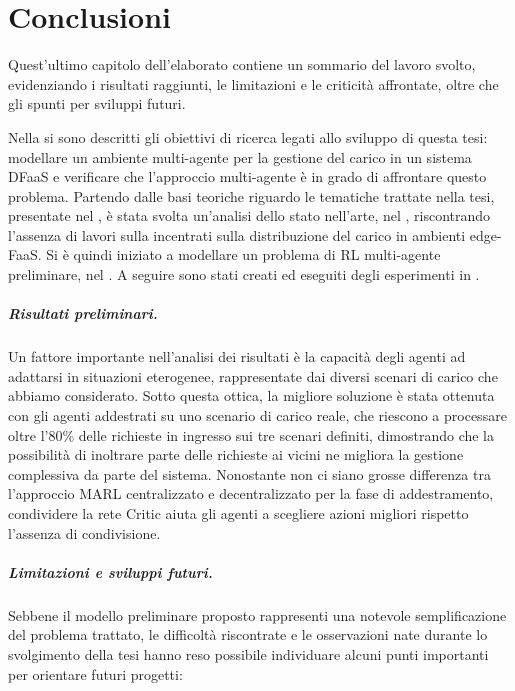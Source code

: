 \chapter{Conclusioni}
\label{sec:6_conclusioni}

Quest'ultimo capitolo dell'elaborato contiene un sommario del lavoro svolto, evidenziando i risultati raggiunti, le limitazioni e le criticità affrontate, oltre che gli spunti per sviluppi futuri.

Nella  si sono descritti gli obiettivi di ricerca legati allo sviluppo di questa tesi: modellare un ambiente multi-agente per la gestione del carico in un sistema DFaaS e verificare che l'approccio multi-agente è in grado di affrontare questo problema. Partendo dalle basi teoriche riguardo le tematiche trattate nella tesi, presentate nel , è stata svolta un'analisi dello stato nell'arte, nel , riscontrando l'assenza di lavori sulla incentrati sulla distribuzione del carico in ambienti edge-FaaS. Si è quindi iniziato a modellare un problema di RL multi-agente preliminare, nel . A seguire sono stati creati ed eseguiti degli esperimenti in .

\paragraph{Risultati preliminari.} Un fattore importante nell'analisi dei risultati è la capacità degli agenti ad adattarsi in situazioni eterogenee, rappresentate dai diversi scenari di carico che abbiamo considerato. Sotto questa ottica, la migliore soluzione è stata ottenuta con gli agenti addestrati su uno scenario di carico reale, che riescono a processare oltre l'80\% delle richieste in ingresso sui tre scenari definiti, dimostrando che la possibilità di inoltrare parte delle richieste ai vicini ne migliora la gestione complessiva da parte del sistema. Nonostante non ci siano grosse differenza tra l'approccio MARL centralizzato e decentralizzato per la fase di addestramento, condividere la rete Critic aiuta gli agenti a scegliere azioni migliori rispetto l'assenza di condivisione.

\paragraph{Limitazioni e sviluppi futuri.} Sebbene il modello preliminare proposto rappresenti una notevole semplificazione del problema trattato, le difficoltà riscontrate e le osservazioni nate durante lo svolgimento della tesi hanno reso possibile individuare alcuni punti importanti per orientare futuri progetti:

